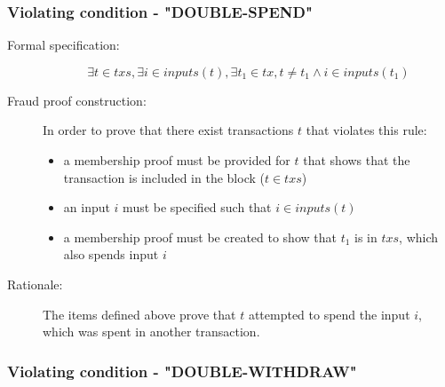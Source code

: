 \documentclass[../main.tex]{subfiles}
\begin{document}
\subsubsection{Violating condition - "DOUBLE-SPEND"}
\label{sec:DOUBLE-SPEND}

\begin{description}

\item[Formal specification:]
\begin{equation*}
    \exists t \in txs, \exists i \in inputs(t), \exists t_1 \in tx, t \neq t_1 \land i \in inputs(t_1)
\end{equation*}

\item[Fraud proof construction:] In order to prove that there exist transactions $t$ that violates this rule:
\begin{itemize}
    \item a membership proof must be provided for $t$ that shows that the transaction is included in the block ($t \in txs$)
    \item an input $i$ must be specified such that $i \in inputs(t)$
    \item a membership proof must be created to show that $t_1$ is in $txs$, which also spends input $i$
\end{itemize}

\item[Rationale:] The items defined above prove that $t$ attempted to spend the input $i$, which was spent in another transaction.

\end{description}

\subsubsection{Violating condition - "DOUBLE-WITHDRAW"}
\label{sec:DOUBLE-WITHDRAW}
\end{document}
